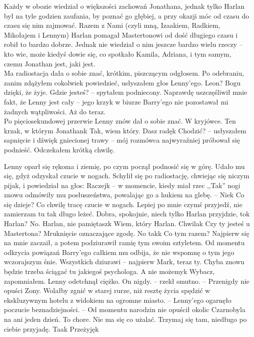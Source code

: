 \documentclass[../MAIN.tex]{subfiles}
\begin{document}
Każdy w obozie wiedział o większości zachowań Jonathana, jednak tylko Harlan był na tyle godzien zaufania, by poznać go głębiej, a przy okazji móc od czasu do czasu się nim zajmować. Razem z Nami (czyli mną, Izaakiem, Radkiem, Mikołajem i Lennym) Harlan pomagał Mastertonowi od dość długiego czasu i robił to bardzo dobrze. Jednak nie wiedział o nim jeszcze bardzo wielu rzeczy -- kto wie, może kiedyś dowie się, co spotkało Kamila, Adriana, i tym samym, czemu Jonathan jest, jaki jest.\\
Ma radiostacja dała o sobie znać, krótkim, piszczącym odgłosem. Po odebraniu, zanim zdążyłem cokolwiek powiedzieć, usłyszałem głos Lenny’ego.
\sx Leon?
\qd
Bogu dzięki, że żyje.
\sx Gdzie jesteś? -- spytałem podniecony. 
\qd
Naprawdę uszczęśliwił mnie fakt, że Lenny jest cały -- jego krzyk w biurze Barry’ego nie pozostawał mi żadnych wątpliwości. Aż do teraz.\\
Po pięciosekundowej przerwie Lenny znów dał o sobie znać.
\sx W kryjówce. Ten krzak, w którym Jonathan\3k
\xx Tak, wiem który. Dasz radę\3k Chodzić? -- usłyszałem sapnięcie i dźwięk gniecionej trawy -- mój rozmówca najwyraźniej próbował się podnieść. Odczekałem krótką chwilę.
\qd

Lenny oparł się rękoma i ziemię, po czym począł podnosić się w górę. Udało mu się, gdyż odzyskał czucie w nogach. Schylił się po radiostację, chwiejąc się niczym pijak, i powiedział na głos:
Raczej\3k -- w momencie, kiedy miał rzec ,,Tak'' nogi znowu odmówiły mu posłuszeństwa, powalając go a hukiem na glebę. -- \sx Nie\3k
\xx Co się dzieje?
\xx Co chwilę tracę czucie w nogach. Lepiej po mnie czymś przyjedź, nie zamierzam tu tak długo leżeć.
\xx Dobra, spokojnie, niech tylko Harlan przyjdzie, to\3k
\xx Harlan?
\xx No. Harlan, nie pamiętasz\3k
\xx Wiem, który Harlan. Chwila\3k Czy ty jesteś u Mastertona?
\qd
Mruknięcie oznaczające zgodę.
\sx No tak\3k Co tym razem?
\xx Najpierw się na mnie zaczaił, a potem podziurawił ramię tym swoim sztyletem.
\xx Od momentu odkrycia powiązań Barry’ego całkiem mu odbija, że nie wspomnę o tym jego wczorajszym śnie. Wszystkich dziurawi -- najpierw Mark, teraz ty. Chyba znowu będzie trzeba ściągać tu jakiegoś psychologa.
\xx A nie możemy\3k Wybacz, zapomniałem.
\qd
Lenny odetchnął ciężko.
\sx On nigdy. -- rzekł smutno. -- Przenigdy nie opuści Zony. Wolałby zgnić w starej rurze, niż resztę życia spędzić w ekskluzywnym hotelu z widokiem na ogromne miasto. -- Lenny’ego ogarnęło poczucie beznadziejności. -- Od momentu narodzin nie opuścił okolic Czarnobyla na ani jeden dzień. To chore.
\xx Nie ma się co użalać. Trzymaj się tam, niedługo po ciebie przyjadę.
\xx Taa\3k Przeżyję\3k
\qd
\end{document}
